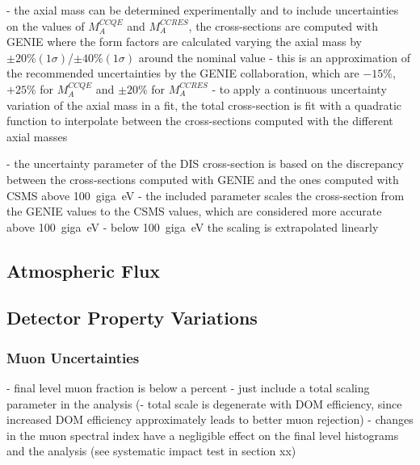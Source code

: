 
- the axial mass can be determined experimentally and to include uncertainties on the values of $M_A^{CCQE}$ and $M_A^{CCRES}$, the cross-sections are computed with \textsc{GENIE} where the form factors are calculated varying the axial mass by $\pm 20\% (1\sigma)$/$\pm 40\% (1\sigma)$ around the nominal value
- this is an approximation of the recommended uncertainties by the GENIE collaboration, which are $-15\%$, $+25\%$ for $M_A^{CCQE}$ and $\pm 20\%$ for $M_A^{CCRES}$ \cite{genie}
- to apply a continuous uncertainty variation of the axial mass in a fit, the total cross-section is fit with a quadratic function to interpolate between the cross-sections computed with the different axial masses


- the uncertainty parameter of the DIS cross-section is based on the discrepancy between the cross-sections computed with GENIE and the ones computed with CSMS  above \SI{100}{giga\electronvolt}
- the included parameter scales the cross-section from the GENIE values to the CSMS values, which are considered more accurate above \SI{100}{giga\electronvolt}
- below \SI{100}{giga\electronvolt} the scaling is extrapolated linearly


\subsection{Atmospheric Flux}

\subsection{Detector Property Variations}

\subsubsection{Muon Uncertainties}

- final level muon fraction is below a percent
- just include a total scaling parameter in the analysis
(- total scale is degenerate with DOM efficiency, since increased DOM efficiency approximately leads to better muon rejection)
- changes in the muon spectral index have a negligible effect on the final level histograms and the analysis (see systematic impact test in section xx)

